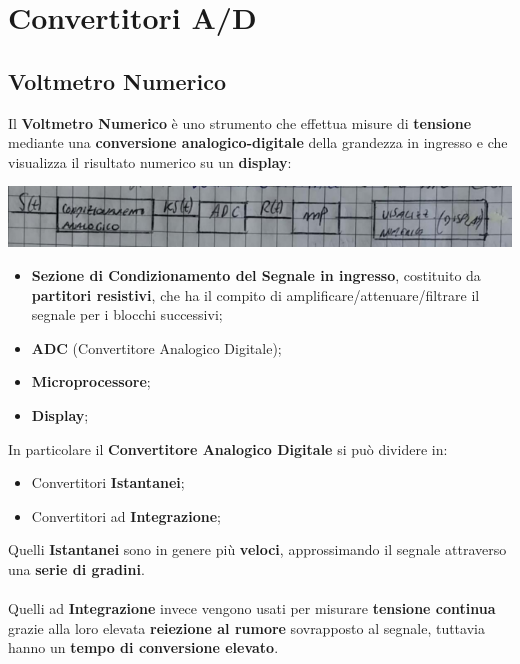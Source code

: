 \chapter{Convertitori A/D}
\section{Voltmetro Numerico}
Il \textbf{Voltmetro Numerico} è uno strumento che effettua misure di \textbf{tensione} mediante una \textbf{conversione analogico-digitale} della grandezza in ingresso e che visualizza il risultato numerico su un \textbf{display}:
\begin{center}
    \includegraphics[width=\textwidth]{Images/figure25.png}
\end{center}
\begin{itemize}
    \item \textbf{Sezione di Condizionamento del Segnale in ingresso}, costituito da \textbf{partitori resistivi}, che ha il compito di amplificare/attenuare/filtrare il segnale per i blocchi successivi;
    \item \textbf{ADC} (Convertitore Analogico Digitale);
    \item \textbf{Microprocessore};
    \item \textbf{Display};
\end{itemize}
In particolare il \textbf{Convertitore Analogico Digitale} si può dividere in:
\begin{itemize}
    \item Convertitori \textbf{Istantanei};
    \item Convertitori ad \textbf{Integrazione};
\end{itemize}
Quelli \textbf{Istantanei} sono in genere più \textbf{veloci}, approssimando il segnale attraverso una\textbf{ serie di gradini}.\\ \\
Quelli ad \textbf{Integrazione} invece vengono usati per misurare \textbf{tensione continua} grazie alla loro elevata \textbf{reiezione al rumore }sovrapposto al segnale, tuttavia hanno un \textbf{tempo di conversione elevato}.
